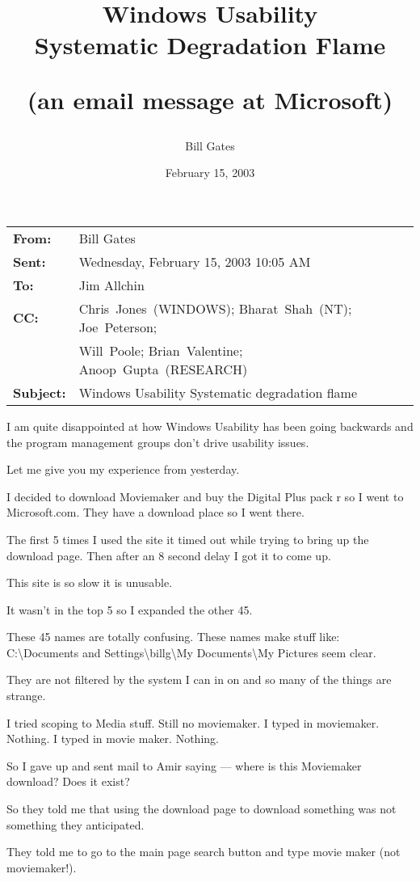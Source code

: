 \documentclass[12pt,letterpaper]{article}
\title{Windows Usability\\
Systematic Degradation Flame\\
\strut \normalsize (an email message at Microsoft)}
\author{Bill Gates}
\date{February 15, 2003}
\begin{document}
\maketitle

\begin{tabular}{@{}>{\bfseries}l@{\,}l}
From:&Bill Gates\\
Sent:&Wednesday, February 15, 2003 10:05 AM\\
To:&Jim Allchin\\
CC:&Chris~Jones~(WINDOWS); Bharat~Shah~(NT); Joe~Peterson;\\
&Will~Poole; Brian~Valentine; Anoop~Gupta~(RESEARCH)\\
Subject:&Windows Usability Systematic degradation flame
\end{tabular}

I am quite disappointed at how Windows Usability has been going backwards and
the program management groups don't drive usability issues.

Let me give you my experience from yesterday.

I decided to download Moviemaker and buy the Digital Plus pack r so I went to Microsoft.com.
They have a download place so I went there.

The first 5 times I used the site it timed out while trying to bring up the download page.
Then after an 8 second delay I got it to come up.

This site is so slow it is unusable.

It wasn't in the top 5 so I expanded the other 45.

These 45 names are totally confusing.
These names make stuff like:\\
C:\textbackslash{}Documents and Settings\textbackslash{}billg\textbackslash{}My
Documents\textbackslash{}My Pictures seem clear.

They are not filtered by the system I can in on and so many of the things are
strange.

I tried scoping to Media stuff.
Still no moviemaker.
I typed in moviemaker. Nothing.
I typed in movie maker. Nothing.

So I gave up and sent mail to Amir saying --- where is this Moviemaker
download? Does it exist?

So they told me that using the download page to download something was not
something they anticipated.

They told me to go to the main page search button and type movie maker (not
moviemaker!).
\end{document}
